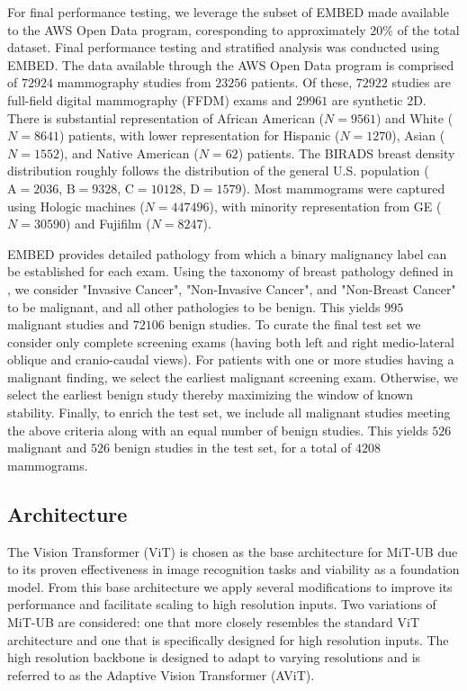 \documentclass[12pt]{article}
\begin{document}
For final performance testing, we leverage the subset of EMBED \cite{embed2023} made available to the AWS Open Data program, 
coresponding to approximately $20\%$ of the total dataset.
Final performance testing and stratified analysis was conducted using EMBED. The data available through the AWS Open Data program is comprised of $72924$ mammography studies from $23256$ patients. Of these, $72922$ studies are  full-field digital mammography (FFDM) exams and $29961$ are synthetic 2D.
There is substantial representation of African American ($N=9561$) and White ($N=8641$) patients, with lower representation for Hispanic ($N=1270$), Asian ($N=1552$), and Native American ($N=62$) patients. The BIRADS breast density distribution roughly follows the distribution of the general U.S. population ($\mathrm{A}=2036$, $\mathrm{B}=9328$, $\mathrm{C}=10128$, $\mathrm{D}=1579$). Most mammograms were captured using Hologic machines ($N=447496$), with minority representation from GE ($N=30590$) and Fujifilm ($N=8247$).

EMBED provides detailed pathology from which a binary malignancy label can be established for each exam. Using the taxonomy
of breast pathology defined in \cite{embed2023}, we consider "Invasive Cancer", "Non-Invasive Cancer", and "Non-Breast Cancer" to be malignant, and all other pathologies to be benign. This yields $995$ malignant studies and $72106$ benign studies.
To curate the final test set we consider only complete screening exams (having both left and right medio-lateral oblique and cranio-caudal views). For patients with one or more studies having a malignant finding, we select the earliest malignant screening exam.
Otherwise, we select the earliest benign study thereby maximizing the window of known stability. 
Finally, to enrich the test set, we include all malignant studies meeting the above criteria along with an equal number of benign studies. 
This yields $526$ malignant and $526$ benign studies in the test set, for a total of $4208$ mammograms.

\subsection{Architecture}

The Vision Transformer (ViT) \cite{dosovitskiy2020vit} is chosen as the base architecture for MiT-UB due to its proven effectiveness in image recognition tasks and viability as a foundation model. From this base architecture we apply several
modifications to improve its performance and facilitate scaling to high resolution inputs. Two variations of MiT-UB are
considered: one that more closely resembles the standard ViT architecture and one that is specifically designed for high resolution inputs. The high resolution backbone is designed to adapt to varying resolutions
and is referred to as the Adaptive Vision Transformer (AViT).
\end{document}
